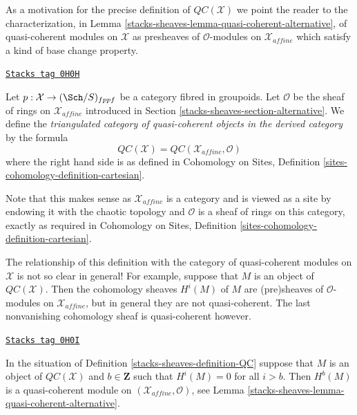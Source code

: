 \medskip\noindent
As a motivation for the precise definition of $\mathit{QC}(\mathcal{X})$
we point the reader to the characterization, in
Lemma \ref{stacks-sheaves-lemma-quasi-coherent-alternative},
of quasi-coherent modules on $\mathcal{X}$ as presheaves of
$\mathcal{O}$-modules on $\mathcal{X}_{affine}$ which
satisfy a kind of base change property.

\begin{definition}[QC]
\label{stacks-sheaves-definition-QC}
\href{https://stacks.math.columbia.edu/tag/0H0H}{\texttt{Stacks tag 0H0H}}

Let $p : \mathcal{X} \to (\Sch/S)_{fppf}$ be a category fibred in groupoids.
Let $\mathcal{O}$ be the sheaf of rings on $\mathcal{X}_{affine}$ introduced
in Section \ref{stacks-sheaves-section-alternative}. We define the
{\it triangulated category of quasi-coherent objects in the derived category}
by the formula
$$
\mathit{QC}(\mathcal{X}) = \mathit{QC}(\mathcal{X}_{affine}, \mathcal{O})
$$
where the right hand side is as defined in
Cohomology on Sites, Definition \ref{sites-cohomology-definition-cartesian}.
\end{definition}

Note that this makes sense as $\mathcal{X}_{affine}$ is a category and
is viewed as a site by endowing it with the chaotic topology and
$\mathcal{O}$ is a sheaf of rings on this category, exactly as required in
Cohomology on Sites, Definition \ref{sites-cohomology-definition-cartesian}.

\medskip\noindent
The relationship of this definition with the category of quasi-coherent
modules on $\mathcal{X}$ is not so clear in general! For example, suppose
that $M$ is an object of $\mathit{QC}(\mathcal{X})$. Then the cohomology
sheaves $H^i(M)$ of $M$ are (pre)sheaves of $\mathcal{O}$-modules on
$\mathcal{X}_{affine}$, but in general they are not quasi-coherent. The last
nonvanishing cohomology sheaf is quasi-coherent however.

\begin{lemma}
\label{stacks-sheaves-lemma-QC-bounded-above}
\href{https://stacks.math.columbia.edu/tag/0H0I}{\texttt{Stacks tag 0H0I}}

In the situation of Definition \ref{stacks-sheaves-definition-QC} suppose that
$M$ is an object of $\mathit{QC}(\mathcal{X})$ and $b \in \mathbf{Z}$
such that $H^i(M) = 0$ for all $i > b$.
Then $H^b(M)$ is a quasi-coherent module on
$(\mathcal{X}_{affine}, \mathcal{O})$, see
Lemma \ref{stacks-sheaves-lemma-quasi-coherent-alternative}.
\end{lemma}

